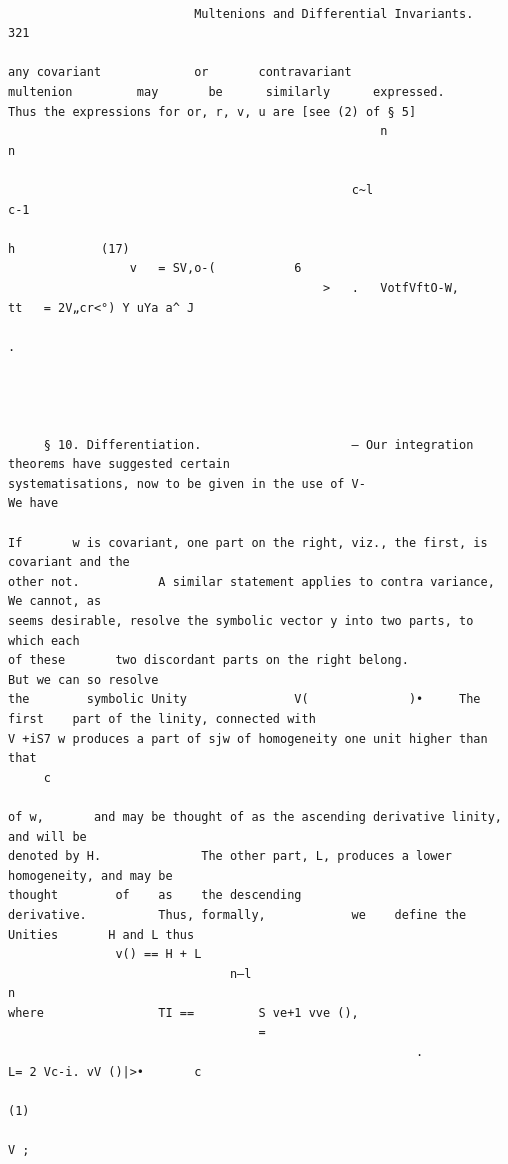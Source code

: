 \documentclass[10pt]{article}
\begin{document}
\begin{verbatim}

                          Multenions and Differential Invariants.                                                                   321

any covariant             or       contravariant                         multenion         may       be      similarly      expressed.
Thus the expressions for or, r, v, u are [see (2) of § 5]
                                                    n                                     n

                                                c~l                                      c-1
                                                                                                                       h            (17)
                 v   = SV,o-(           6
                                            >   .   VotfVftO-W,                  tt   = 2V„cr<°) Y uYa a^ J
                                                                                                     .




     § 10. Differentiation.                     — Our integration theorems have suggested certain
systematisations, now to be given in the use of V-                                                   We have

If       w is covariant, one part on the right, viz., the first, is covariant and the
other not.           A similar statement applies to contra variance, We cannot, as
seems desirable, resolve the symbolic vector y into two parts, to which each
of these       two discordant parts on the right belong.                                                  But we can so resolve
the        symbolic Unity               V(              )•     The       first    part of the linity, connected with
V +iS7 w produces a part of sjw of homogeneity one unit higher than that
     c

of w,       and may be thought of as the ascending derivative linity, and will be
denoted by H.              The other part, L, produces a lower homogeneity, and may be
thought        of    as    the descending                            derivative.          Thus, formally,            we    define the
Unities       H and L thus
               v() == H + L
                               n—l                                                            n
where                TI ==         S ve+1 vve (),
                                   =
                                                         .                            L= 2 Vc-i. vV ()|>•       c
                                                                                                                                      (1)
                                                                                                                                      V ;


\end{verbatim}
\end{document}
